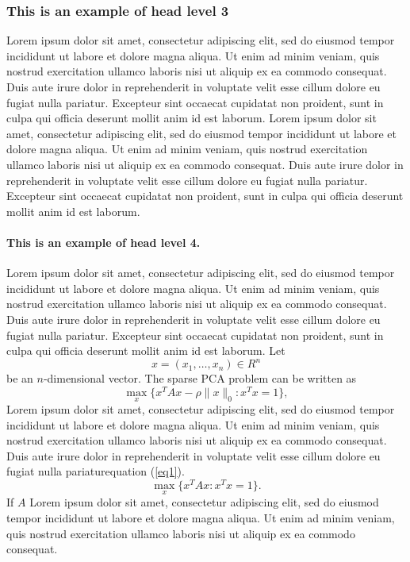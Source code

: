 \documentclass[english]{sbcreviews-2025}%
\begin{document}
\subsubsection{This is an example of head level 3}
Lorem ipsum dolor sit amet, consectetur adipiscing elit, sed do eiusmod tempor incididunt ut labore et dolore magna aliqua. Ut enim ad minim veniam, quis nostrud exercitation ullamco laboris nisi ut aliquip ex ea commodo consequat. Duis aute irure dolor in reprehenderit in voluptate velit esse cillum dolore eu fugiat nulla pariatur. Excepteur sint occaecat cupidatat non proident, sunt in culpa qui officia deserunt mollit anim id est laborum. Lorem ipsum dolor sit amet, consectetur adipiscing elit, sed do eiusmod tempor incididunt ut labore et dolore magna aliqua. Ut enim ad minim veniam, quis nostrud exercitation ullamco laboris nisi ut aliquip ex ea commodo consequat. Duis aute irure dolor in reprehenderit in voluptate velit esse cillum dolore eu fugiat nulla pariatur. Excepteur sint occaecat cupidatat non proident, sunt in culpa qui officia deserunt mollit anim id est laborum.

\paragraph{This is an example of head level 4.}
Lorem ipsum dolor sit amet, consectetur adipiscing elit, sed do eiusmod tempor incididunt ut labore et dolore magna aliqua. Ut enim ad minim veniam, quis nostrud exercitation ullamco laboris nisi ut aliquip ex ea commodo consequat. Duis aute irure dolor in reprehenderit in voluptate velit esse cillum dolore eu fugiat nulla pariatur. Excepteur sint occaecat cupidatat non proident, sunt in culpa qui officia deserunt mollit anim id est laborum.
Let
\[
x=(x_1,\dots,x_n)\in R^n
\]be an \(n\)-dimensional vector. The sparse PCA problem can be written as
\begin{equation}\label{eq1}
\max\limits_{x}\{x^TAx-\rho\|x\|_0:x^Tx=1\},
\end{equation}
Lorem ipsum dolor sit amet, consectetur adipiscing elit, sed do eiusmod tempor incididunt ut labore et dolore magna aliqua. Ut enim ad minim veniam, quis nostrud exercitation ullamco laboris nisi ut aliquip ex ea commodo consequat. Duis aute irure dolor in reprehenderit in voluptate velit esse cillum dolore eu fugiat nulla pariatur\break equation (\ref{eq1}).
\[\max\limits_{x}\{x^TAx :x^Tx=1\}.\]
If $A$ Lorem ipsum dolor sit amet, consectetur adipiscing elit, sed do eiusmod tempor incididunt ut labore et dolore magna aliqua. Ut enim ad minim veniam, quis nostrud exercitation ullamco laboris nisi ut aliquip ex ea commodo consequat.
\end{document}
